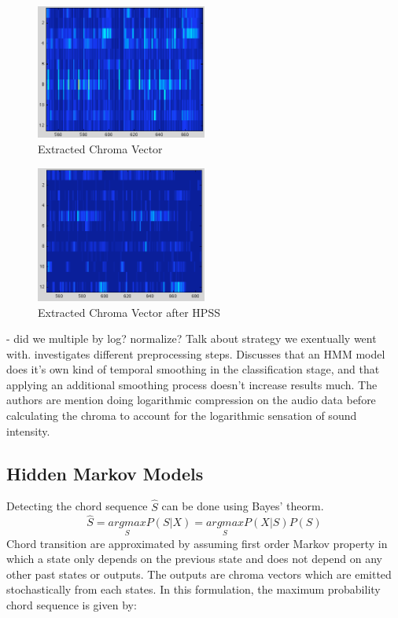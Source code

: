 \documentclass{article}
\begin{document}
\begin{figure}
   \centering
    \includegraphics[width=0.5\textwidth]{187.png}
   \caption{Extracted Chroma Vector}
   \label{fig:Chroma}
\end{figure}

\begin{figure}
   \centering
    \includegraphics[width=0.5\textwidth]{187h.png}
   \caption{Extracted Chroma Vector after HPSS}
   \label{fig:ChromaHPSS}
\end{figure}

- did we multiple by log? normalize? Talk about strategy we exentually went with.
\cite{Jiang:22} investigates different preprocessing steps. Discusses that
an HMM model does it's own kind of temporal smoothing in the classification
stage, and that applying an additional smoothing process doesn't increase results much.
The authors are mention doing logarithmic compression on the audio data before
calculating the chroma to account for the logarithmic sensation of sound intensity.

\subsection{Hidden Markov Models}

Detecting the chord sequence $\hat{S}$ can be done using Bayes' theorm.
$$\hat{S} = \underset{S}{argmax} P(S|X) = \underset{S}{argmax} P(X|S) P(S)$$
Chord transition are approximated by assuming first order Markov property in which a state only depends
on the previous state and does not depend on any other past states or outputs. The outputs are chroma
vectors which are emitted stochastically from each states. In this formulation, the maximum probability
chord sequence is given by:
\end{document}
